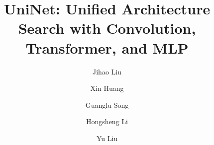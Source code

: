 \documentclass[runningheads]{llncs}
\begin{document}
\pagestyle{headings}
\mainmatter
\def\ECCVSubNumber{4429}  

\title{UniNet: Unified Architecture Search with Convolution, Transformer, and MLP} 

\begin{comment}
\titlerunning{ECCV-22 submission ID \ECCVSubNumber} 
\authorrunning{ECCV-22 submission ID \ECCVSubNumber} 
\author{Anonymous ECCV submission}
\institute{Paper ID \ECCVSubNumber}
\end{comment}


\author{Jihao Liu \and Xin Huang \and Guanglu Song \and Hongsheng Li\textsuperscript{\Letter} \and Yu Liu\textsuperscript{\Letter}}

\maketitle
\end{document}
